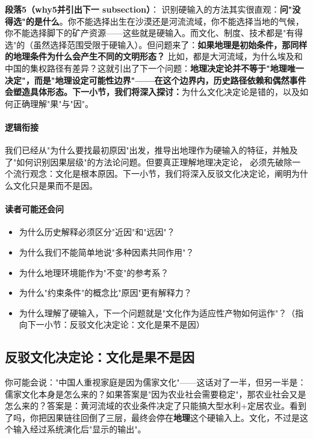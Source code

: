 \documentclass[../main.tex]{subfiles}
\begin{document}
	\textbf{段落5（why5并引出下一 subsection）}：  
	识别硬输入的方法其实很直观：\textbf{问"没得选"的是什么}。你不能选择出生在沙漠还是河流流域，你不能选择当地的气候，你不能选择脚下的矿产资源——这些就是硬输入。而文化、制度、技术都是"有得选"的（虽然选择范围受限于硬输入）。但问题来了：\textbf{如果地理是初始条件，那同样的地理条件为什么会产生不同的文明形态？} 比如，都是大河流域，为什么埃及和中国的集权路径有差异？这就引出了下一个问题：\textbf{地理决定论并不等于"地理唯一决定"，而是"地理设定可能性边界"——在这个边界内，历史路径依赖和偶然事件会塑造具体形态。下一小节，我们将深入探讨：}为什么文化决定论是错的，以及如何正确理解"果"与"因"。
	
	\paragraph*{逻辑衔接}
		我们已经从"为什么要找最初原因"出发，推导出地理作为硬输入的特征，并触及了"如何识别因果层级"的方法论问题。但要真正理解地理决定论，
	必须先破除一个流行观念：文化是根本原因。下一小节，我们将深入反驳文化决定论，阐明为什么文化只是果而不是因。
	
	\paragraph*{读者可能还会问}
	\begin{itemize}
	\item 为什么历史解释必须区分"近因"和"远因"？
	\item 为什么我们不能简单地说"多种因素共同作用"？
	\item 为什么地理环境能作为"不变"的参考系？
	\item 为什么"约束条件"的概念比"原因"更有解释力？
	\item 为什么理解了硬输入，下一个问题就是"文化作为适应性产物如何运作"？（指向下一小节：反驳文化决定论：文化是果不是因）
	\end{itemize}
	
	\subsection{反驳文化决定论：文化是果不是因}
	
	\begin{motivation}
		你可能会说："中国人重视家庭是因为儒家文化"——这话对了一半，但另一半是：儒家文化本身是怎么来的？如果答案是"因为农业社会需要稳定"，那农业社会又是怎么来的？答案是：黄河流域的农业条件决定了只能搞大型水利+定居农业。看到了吗，你把因果链往回倒了三层，最终会停在\textbf{地理}这个硬输入上。文化，不过是这个输入经过系统演化后"显示的输出"。
	\end{motivation}
	
\end{document}
